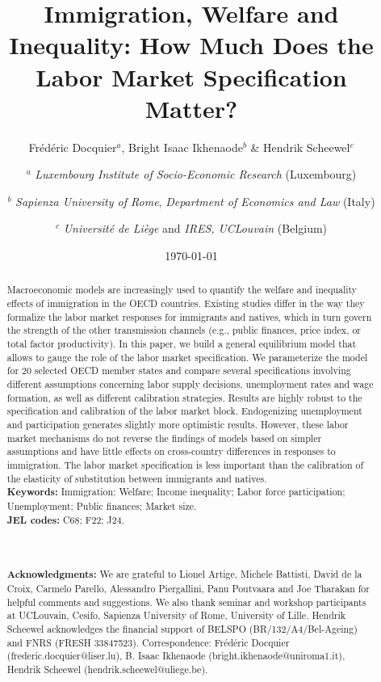 \documentclass[a4paper,12pt]{article}
\begin{document}
\title{Immigration, Welfare and Inequality: How Much Does the Labor Market Specification Matter?}

\author{Fr\'{e}d\'{e}ric Docquier$^{a}$, Bright Isaac Ikhenaode$^{b}$ \& Hendrik Scheewel$^{c}$ \and 
$^{a}$ {\footnotesize \textit{Luxembourg Institute of Socio-Economic Research} (Luxembourg)} \and $^{b}$ {\footnotesize \textit{Sapienza University of Rome}, \textit{Department of Economics and Law} (Italy)} \and $^{c}$ {\footnotesize \textit{Universit\'{e} de Li\`{e}ge} and \textit{IRES, UCLouvain} (Belgium)}}
\date{\monthyeardate\today}
\maketitle

\begin{abstract}
Macroeconomic models are increasingly used to quantify the welfare and inequality effects of immigration in the OECD countries. Existing studies differ in the way they formalize the labor market responses for immigrants and natives, which in turn govern the strength of the other transmission channels (e.g., public finances, price index, or total factor productivity). In this paper, we build a general equilibrium model that allows to gauge the role of the labor market specification. We parameterize the model for 20 selected OECD member states and compare several specifications involving different assumptions concerning labor supply decisions, unemployment rates and wage formation, as well as different calibration strategies. Results are highly robust to the specification and calibration of the labor market block. Endogenizing unemployment and participation generates slightly more optimistic results. However, these labor market mechanisms do not reverse the findings of models based on simpler assumptions and have little effects on cross-country differences in responses to immigration.  The labor market specification is less important than the calibration of the elasticity of substitution between immigrants and natives. \\[0.3cm]
\textbf{Keywords:} Immigration; Welfare; Income inequality; Labor force participation; Unemployment; Public finances; Market size.
\\
\textbf{JEL codes:} C68; F22; J24.
\\
\\
\\
\\
\textbf{Acknowledgments:} We are grateful to Lionel Artige, Michele Battisti, David de la Croix, Carmelo Parello, Alessandro Piergallini, Panu Poutvaara and Joe Tharakan for helpful comments and suggestions. We also thank seminar and workshop participants at UCLouvain, Cesifo, Sapienza University of Rome, University of Lille. Hendrik Scheewel acknowledges the financial support of BELSPO (BR/132/A4/Bel-Ageing) and FNRS (FRESH 33847523). Correspondence: Fr\'{e}d\'{e}ric Docquier (frederic.docquier@liser.lu), B. Isaac Ikhenaode (bright.ikhenaode@uniroma1.it), Hendrik Scheewel (hendrik.scheewel@uliege.be).
\end{abstract}
\end{document}
